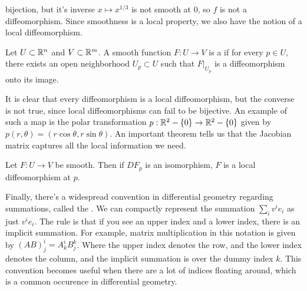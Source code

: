 bijection, but it's inverse $x \mapsto x^{1/3}$ is not smooth at $0$, so
$f$ is not a diffeomorphism. Since smoothness is a local property, we
also have the notion of a local diffeomorphism.
%
\begin{defn}
	Let $U \subset \mathbb{R}^n$ and $V \subset \mathbb{R}^m$. A smooth function
	$F : U \to V$ is a  if for every $p \in U$,
	there exists an open neighborhood $U_p \subset U$ such that
	$F\vert_{U_p}$ is a diffeomorphism onto its image.
\end{defn}
%
It is clear that every diffeomorphism is a local diffeomorphism, but
the converse is not true, since local diffeomorphisms can fail to be
bijective. An example of such a map is the polar transformation
$p : \mathbb{R}^2-\left\lbrace 0 \right\rbrace \to \mathbb{R}^2-\left\lbrace 0 \right\rbrace$ given by
$p(r,\theta) = (r\cos\theta,r\sin\theta)$. An important theorem tells us
that the Jacobian matrix captures all the local information we need.
%
\begin{thm}
	Let $F : U \to V$ be smooth. Then if $DF_p$ is an isomorphism, $F$ is a
	local diffeomorphism at $p$.
\end{thm}
%
Finally, there's a widespread convention in differential geometry
regarding summations, called the . We
can compactly represent the summation $\sum_i v^ie_i$ as just $v^ie_i$.
The rule is that if you see an upper index and a lower index, there is
an implicit summation. For example, matrix multiplication in this
notation is given by $(AB)^i_j = A^i_kB^k_j$. Where the upper index denotes
the row, and the lower index denotes the column, and the implicit
summation is over the dummy index $k$. This convention becomes
useful when there are a lot of indices floating around, which is
a common occurence in differential geometry.
